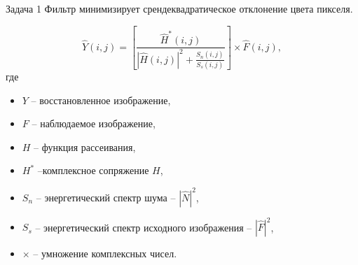 
\begin{frame}{Задача 1}
	Фильтр минимизирует срендеквадратическое отклонение цвета пикселя.
	
	\begin{equation*}\label{eq:wiener_nsr}
	\hat{Y}(i, j) = \left[ \frac{\hat{H}^*(i, j)}{\left|\hat{H}(i, j)\right|^2 + \frac{S_n(i, j)}{S_s(i, j)}} \right] \times \hat{F}(i, j),
	\end{equation*}
где
\begin{itemize}[noitemsep]
	\item $Y$ -- восстановленное изображение,
	\item $F$ -- наблюдаемое изображение,
	\item $H$ -- функция рассеивания,
	\item $H^*$ --комплексное сопряжение $H$,  
	\item $S_n$ -- энергетический спектр шума -- $\left| \hat{N} \right|^2$,
	\item $S_s$ -- энергетический спектр исходного изображения -- $\left| \hat{F} \right|^2$,
	\item $\times$ -- умножение комплексных чисел.
\end{itemize}
\end{frame}